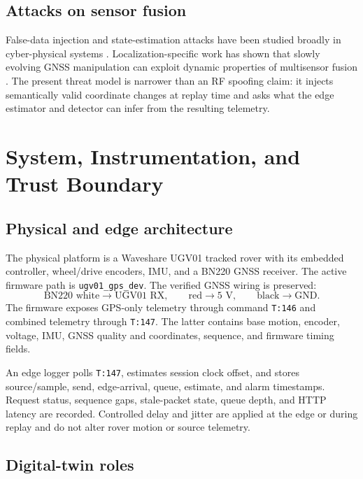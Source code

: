 \documentclass[11pt,a4paper]{article}
\begin{document}
\subsection{Attacks on sensor fusion}

False-data injection and state-estimation attacks have been studied broadly in
cyber-physical systems \cite{pasqualetti2013,fawzi2014}. Localization-specific
work has shown that slowly evolving GNSS manipulation can exploit dynamic
properties of multisensor fusion \cite{shen2020}. The present threat model is
narrower than an RF spoofing claim: it injects semantically valid coordinate
changes at replay time and asks what the edge estimator and detector can infer
from the resulting telemetry.

\section{System, Instrumentation, and Trust Boundary}

\subsection{Physical and edge architecture}

The physical platform is a Waveshare UGV01 tracked rover with its embedded
controller, wheel/drive encoders, IMU, and a BN220 GNSS receiver. The active
firmware path is \texttt{ugv01\_gps\_dev}. The verified GNSS wiring is preserved:
\[
\text{BN220 white}\rightarrow\text{UGV01 RX},\qquad
\text{red}\rightarrow 5\text{ V},\qquad
\text{black}\rightarrow\text{GND}.
\]
The firmware exposes GPS-only telemetry through command \texttt{T:146} and
combined telemetry through \texttt{T:147}. The latter contains base motion,
encoder, voltage, IMU, GNSS quality and coordinates, sequence, and firmware
timing fields.

An edge logger polls \texttt{T:147}, estimates session clock offset, and stores
source/sample, send, edge-arrival, queue, estimate, and alarm timestamps.
Request status, sequence gaps, stale-packet state, queue depth, and HTTP
latency are recorded. Controlled delay and jitter are applied at the edge or
during replay and do not alter rover motion or source telemetry.

\subsection{Digital-twin roles}
\end{document}

